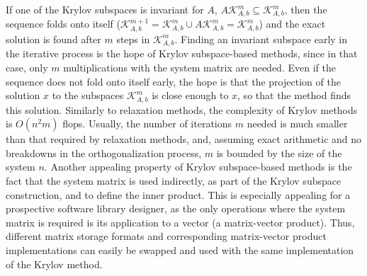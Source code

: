 If one of the Krylov subspaces is invariant for $A$, \ie $A \mathcal{K}_{A,
b}^m \subseteq \mathcal{K}_{A, b}^m$, then the sequence folds onto itself
($\mathcal{K}_{A, b}^{m + 1} = \mathcal{K}_{A, b}^m \cup A \mathcal{K}_{A, b}^m
= \mathcal{K}_{A, b}^m$) and the exact solution is found after $m$ steps in
$\mathcal{K}_{A, b}^m$. Finding an invariant subspace early in the iterative
process is the hope of Krylov subspace-based methods, since in that case, only
$m$ multiplications with the system matrix are needed. Even if the sequence does
not fold onto itself early, the hope is that the projection of the solution $x$
to the subspaces $\mathcal{K}_{A, b}^m$ is close enough to $x$, so that the
method finds this solution. Similarly to relaxation methods, the complexity of
Krylov methods is $O(n^2 m)$ flops. Usually, the number of iterations $m$ needed
is much smaller than that required by relaxation methods, and, assuming exact
arithmetic and no breakdowns in the orthogonalization process, $m$ is bounded by
the size of the system $n$.  Another appealing property of Krylov subspace-based
methods is the fact that the system matrix is used indirectly, as part of the
Krylov subspace construction, and to define the inner product. This is
especially appealing for a prospective software library designer, as the only
operations where the system matrix is required is its application to a vector
(\ie a matrix-vector product).  Thus, different matrix storage formats and
corresponding matrix-vector product implementations can easily be swapped and
used with the same implementation of the Krylov method.

